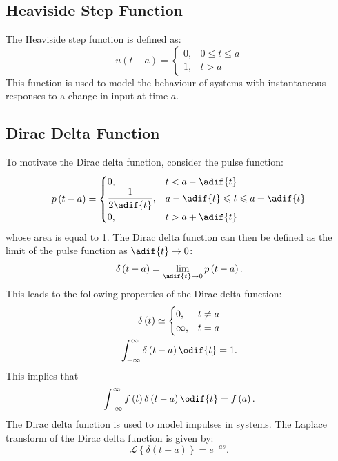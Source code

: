 \documentclass{article}
\begin{document}
\subsection{Heaviside Step Function}
The Heaviside step function is defined as:
\begin{equation*}
    u\left( t - a \right) =
    \begin{cases}
        0, & 0 \leqslant t \leqslant a \\
        1, & t > a
    \end{cases}
\end{equation*}
This function is used to model the behaviour of systems
with instantaneous responses to a change in input at time \(a\).
\subsection{Dirac Delta Function}
To motivate the Dirac delta function, consider the pulse function:
\begin{equation*}
    p\left( t - a \right) =
    \begin{cases}
        \displaystyle 0,                    & t < a - \adif{t}                                \\
        \displaystyle \frac{1}{2 \adif{t}}, & a - \adif{t} \leqslant t \leqslant a + \adif{t} \\
        \displaystyle 0,                    & t > a + \adif{t}
    \end{cases}
\end{equation*}
whose area is equal to 1.
The Dirac delta function can then be defined as the limit of the pulse
function as \(\adif{t} \to 0\):
\begin{equation*}
    \delta\left( t - a \right) = \lim_{\adif{t} \to 0} p\left( t - a \right).
\end{equation*}
This leads to the following properties of the Dirac delta function:
\begin{gather*}
    \delta\left( t \right) \simeq
    \begin{cases}
        0,      & t \neq a \\
        \infty, & t = a
    \end{cases}
    \\
    \int_{-\infty}^\infty \delta\left( t - a \right) \odif{t} = 1.
\end{gather*}
This implies that
\begin{equation*}
    \int_{-\infty}^\infty f\left( t \right) \delta\left( t - a \right) \odif{t} = f\left( a \right).
\end{equation*}
The Dirac delta function is used to model impulses in systems. The
Laplace transform of the Dirac delta function is given by:
\begin{equation*}
    \mathscr{L}\left\{ \delta\left( t - a \right) \right\} = e^{-as}.
\end{equation*}
\end{document}

